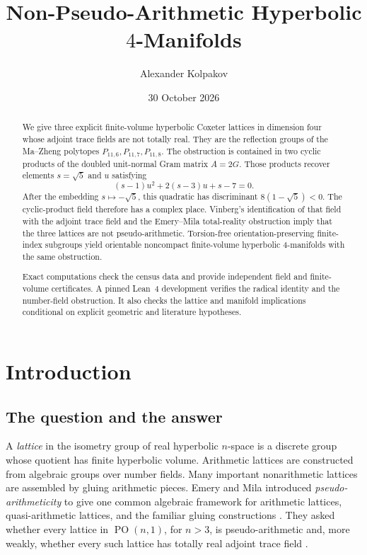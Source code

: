 \documentclass[11pt]{article}
\title{Non-Pseudo-Arithmetic Hyperbolic \(4\)-Manifolds}
\author{Alexander Kolpakov}
\date{30 October 2026}
\numberwithin{equation}{section}
\theoremstyle{definition}
\theoremstyle{remark}
\newcommand{\PO}{\operatorname{PO}}
\begin{document}
\maketitle

\begin{abstract}
We give three explicit finite-volume hyperbolic Coxeter lattices in dimension
four whose adjoint trace fields are not totally real.  They are the reflection
groups of the Ma--Zheng polytopes
\(P_{11,6},P_{11,7},P_{11,8}\).  The obstruction is contained in two cyclic
products of the doubled unit-normal Gram matrix \(A=2G\).  Those products
recover elements \(s=\sqrt5\) and \(u\) satisfying
\[
 (s-1)u^2+2(s-3)u+s-7=0.
\]
After the embedding \(s\mapsto-\sqrt5\), this quadratic has discriminant
\(8(1-\sqrt5)<0\).  The cyclic-product field therefore has a complex place.
Vinberg's identification of that field with the adjoint trace field and the
Emery--Mila total-reality obstruction imply that the three lattices are not
pseudo-arithmetic.  Torsion-free orientation-preserving finite-index
subgroups yield orientable noncompact finite-volume hyperbolic
\(4\)-manifolds with the same obstruction.

Exact computations check the census data and provide independent field and
finite-volume certificates.  A pinned Lean~4 development verifies the
radical identity and the number-field obstruction.  It also checks the
lattice and manifold implications conditional on explicit geometric and
literature hypotheses.
\end{abstract}

\tableofcontents

\section{Introduction}
\label{sec:introduction}

\subsection{The question and the answer}

A \emph{lattice} in the isometry group of real hyperbolic \(n\)-space is a
discrete group whose quotient has finite hyperbolic volume.  Arithmetic
lattices are constructed from algebraic groups over number fields.  Many
important nonarithmetic lattices are assembled by gluing arithmetic pieces.
Emery and Mila introduced \emph{pseudo-arithmeticity} to give one common
algebraic framework for arithmetic lattices, quasi-arithmetic lattices, and
the familiar gluing constructions \cite{EmeryMila}.  They asked whether every
lattice in \(\PO(n,1)\), for \(n>3\), is pseudo-arithmetic and, more weakly,
whether every such lattice has totally real adjoint trace field
\cite[Questions~1.8 and~1.10]{EmeryMila}.
\end{document}
